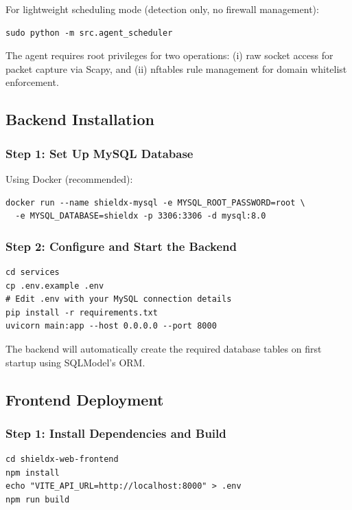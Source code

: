 \documentclass[../Main.tex]{subfiles}
\begin{document}
For lightweight scheduling mode (detection only, no firewall management):

\begin{verbatim}
sudo python -m src.agent_scheduler
\end{verbatim}

The agent requires root privileges for two operations: (i) raw socket access for packet capture via Scapy, and (ii) nftables rule management for domain whitelist enforcement.

\subsection{Backend Installation}

\subsubsection{Step 1: Set Up MySQL Database}

Using Docker (recommended):

\begin{verbatim}
docker run --name shieldx-mysql -e MYSQL_ROOT_PASSWORD=root \
  -e MYSQL_DATABASE=shieldx -p 3306:3306 -d mysql:8.0
\end{verbatim}

\subsubsection{Step 2: Configure and Start the Backend}

\begin{verbatim}
cd services
cp .env.example .env
# Edit .env with your MySQL connection details
pip install -r requirements.txt
uvicorn main:app --host 0.0.0.0 --port 8000
\end{verbatim}

The backend will automatically create the required database tables on first startup using SQLModel's ORM.

\subsection{Frontend Deployment}

\subsubsection{Step 1: Install Dependencies and Build}

\begin{verbatim}
cd shieldx-web-frontend
npm install
echo "VITE_API_URL=http://localhost:8000" > .env
npm run build
\end{verbatim}
\end{document}
